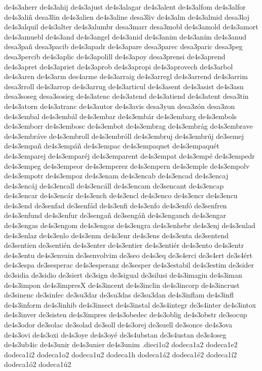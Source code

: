 {de4s3aherr
de4s3ahij
de4s3ajust
de4s3alagar
de4s3alent
de4s3alfom
de4s3alfor
de4s3aliñ
desa3lin
de4s3alien
de4s3aline
desa3liv
de4s3alm
de4s3almid
desa3loj
de4s3alquil
de4s3alter
de4s3alumbr
desa3marr
desa3mobl
de4s3amold
de4s3amort
de4s3amuebl
de4s3and
de4s3angel
de4s3anid
de4s3anim
de4s3aním
de4s3anud
desa3pañ
desa3pacib
de4s3apadr
de4s3apare
desa3parec
desa3paric
desa3peg
desa3percib
de4s3aplic
de4s3apolill
de4s3apoy
desa3prensi
de4s3aprend
de4s3apret
de4s3apriet
de4s3aprob
de4s3apropi
de4s3aprovech
de4s3arbol
de4s3aren
de4s3arm
des4arme
de4s3arraig
de4s3arregl
de4s3arrend
de4s3arrim
desa3rroll
de4s3arrop
de4s3arrug
de4s3articul
de4s3asent
de4s3asist
de4s3asn
desa3soseg
desa3sosieg
de4s3atenc
de4s3atend
de4s3atiend
de4s3atent
desa3tin
de4s3atorn
de4s3atranc
de4s3autor
de4s3avis
desa3yun
desa3zón
desa3zon
de4s3embal
de4s3embál
de4s3embar
de4s3embár
de4s3embarg
de4s3embols
de4s3emborr
de4s3embosc
de4s3embot
de4s3embrag
de4s3embrág
de4s3embrave
de4s3embráve
de4s3embroll
de4s3embróll
de4s3embruj
de4s3embrúj
de3semej
de4s3empañ
de4s3empáñ
de4s3empac
de4s3empaquet
de4s3empaquét
de4s3emparej
de4s3emparéj
de4s3emparent
de4s3empat
de4s3empé
de4s3empedr
de4s3empeg
de4s3empeor
de4s3emperez
de4s3empern
de4s3emple
de4s3empolv
de4s3empotr
de4s3empoz
de4s3enam
de4s3encab
de4s3encad
de4s3encaj
de4s3encáj
de4s3encall
de4s3encáll
de4s3encam
de3sencant
de4s3encap
de4s3encar
de4s3encár
de4s3ench
de4s3encl
de4s3enco
de4s3encr
de4s3encu
de4s3end
de3senfad
de3senfád
de4s3enfi
de4s3enfo
de4s3enfó
de3senfren
de4s3enfund
de4s3enfur
de3sengañ
de3sengáñ
de4s3enganch
de4s3engar
de4s3engas
de4s3engom
de4s3engoz
de4s3engra
de4s3enhebr
de4s3enj
de4s3enlad
de4s3enlaz
de4s3enlo
de4s3enm
de4s3enr
de4s3ens
de4s3enta
de3sentend
de3sentien
de3sentién
de4s3enter
de4s3entier
de4s3entiér
de4s3ento
de4s3entr
de4s3entu
de4s3envain
de3senvolvim
de3seo
de4s3eq
de3s4erci
de3s4ert
de3s4ért
de4s3espa
de3sesperac
de4s3esperanz
de3sesper
de4s3estabil
de4s3estim
de3sider
de3sidia
de3sidio
de3siert
de3sign
de3sigual
de3silusi
de4s3imagin
de4s3iman
de4s3impon
de4s3impresX
de4s3incent
de4s3inclin
de4s3incorp
de4s3incrust
de3sinenc
de3sinfec
de3su3dar de3su3das de3su3dan
de4s3inflam
de4s3infl
de4s3inform
de4s3inhib
de4s3insect
de4s3instal
de3s4integr
de3s4inter
de4s3intox
de4s3inver
de3sisten
de4s3impres
de4s3obedec
de4s3oblig
de4s3obstr
de3socup
de4s3odor
de3solac
de3solad
de3soll
de4s3orej
de3suell
de3sonce
de4s3ova
de4s3ovi
de4s3oxi
de4s3oye
de4s3oyé
de3s4ubstan
de3s4ustan
de3s4oseg
de4s3ub4ic
de4s3unir
de4s3unier
de4s3unim
.dieci1o2
dodeca1a2 dodeca1e2 dodeca1i2 dodeca1o2 dodeca1u2 dodeca1h
dodeca1á2 dodeca1é2 dodeca1í2 dodeca1ó2 dodeca1ú2
}
